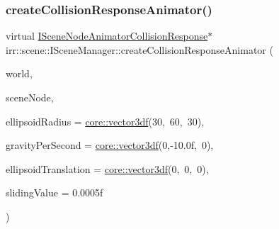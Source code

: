 \mbox{\label{classirr_1_1scene_1_1ISceneManager_a67b266cc40ebd66b5d21c26a78f002be}} 
\subsubsection{\texorpdfstring{create\+Collision\+Response\+Animator()}{createCollisionResponseAnimator()}\hspace{0.1cm}{\footnotesize\ttfamily [2/2]}}
{\footnotesize\ttfamily virtual \hyperlink{classirr_1_1scene_1_1ISceneNodeAnimatorCollisionResponse}{I\+Scene\+Node\+Animator\+Collision\+Response}$\ast$ irr\+::scene\+::\+I\+Scene\+Manager\+::create\+Collision\+Response\+Animator (\begin{DoxyParamCaption}\item[{\hyperlink{classirr_1_1scene_1_1ITriangleSelector}{I\+Triangle\+Selector} $\ast$}]{world,  }\item[{\hyperlink{classirr_1_1scene_1_1ISceneNode}{I\+Scene\+Node} $\ast$}]{scene\+Node,  }\item[{const \hyperlink{namespaceirr_1_1core_ae6e2b2a6c552833ebbd5b7463d03586b}{core\+::vector3df} \&}]{ellipsoid\+Radius = {\ttfamily \hyperlink{namespaceirr_1_1core_ae6e2b2a6c552833ebbd5b7463d03586b}{core\+::vector3df}(30,~60,~30)},  }\item[{const \hyperlink{namespaceirr_1_1core_ae6e2b2a6c552833ebbd5b7463d03586b}{core\+::vector3df} \&}]{gravity\+Per\+Second = {\ttfamily \hyperlink{namespaceirr_1_1core_ae6e2b2a6c552833ebbd5b7463d03586b}{core\+::vector3df}(0,-\/10.0f,~0)},  }\item[{const \hyperlink{namespaceirr_1_1core_ae6e2b2a6c552833ebbd5b7463d03586b}{core\+::vector3df} \&}]{ellipsoid\+Translation = {\ttfamily \hyperlink{namespaceirr_1_1core_ae6e2b2a6c552833ebbd5b7463d03586b}{core\+::vector3df}(0,~0,~0)},  }\item[{\hyperlink{namespaceirr_a0277be98d67dc26ff93b1a6a1d086b07}{f32}}]{sliding\+Value = {\ttfamily 0.0005f} }\end{DoxyParamCaption})\hspace{0.3cm}{\ttfamily [pure virtual]}}



